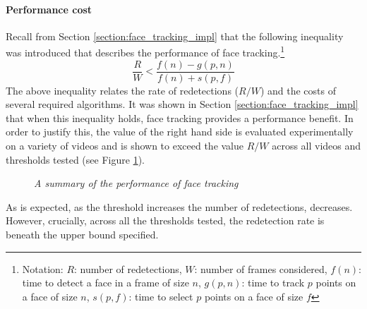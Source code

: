 \paragraph{Performance cost}
Recall from Section \ref{section:face_tracking_impl} that the following inequality was introduced that describes the performance of face tracking.\footnote{Notation: $R$: number of redetections, $W$: number of frames considered, $f(n)$: time to detect a face in a frame of size $n$, $g(p,n)$: time to track $p$ points on a face of size $n$, $s(p,f)$: time to select $p$ points on a face of size $f$}
\begin{equation*}
    \frac{R}{W} < \frac{f(n)-g(p,n)}{f(n)+s(p,f)}
\end{equation*}
The above inequality relates the rate of redetections ($R/W$) and the costs of several required algorithms. It was shown in Section \ref{section:face_tracking_impl} that when this inequality holds, face tracking provides a performance benefit.
In order to justify this, the value of the right hand side is evaluated experimentally on a variety of videos and is shown to exceed the value $R/W$ across all videos and thresholds tested (see Figure \ref{fig:face_tracking_perf}).
\begin{figure}[H]
    \centering
    \quad
    \caption{\textit{A summary of the performance of face tracking}}
    \label{fig:face_tracking_perf}
\end{figure}
\noindent
As is expected, as the threshold increases the number of redetections, decreases. However, crucially, across all the thresholds tested, the redetection rate is beneath the upper bound specified.





